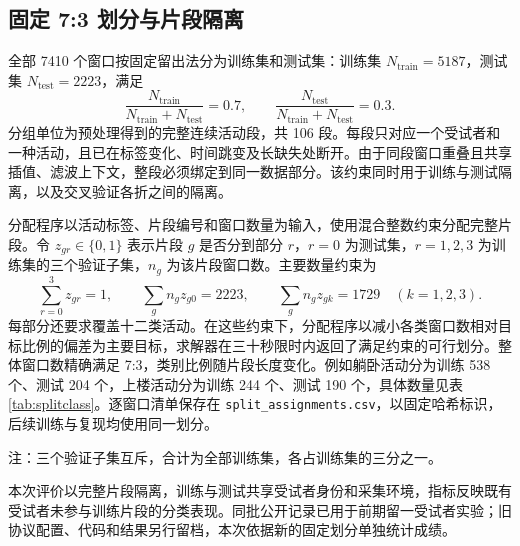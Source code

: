 \documentclass[UTF8,zihao=-4,a4paper,fontset=windows]{ctexart}
\begin{document}
\subsection{固定 7:3 划分与片段隔离}
全部 7410 个窗口按固定留出法分为训练集和测试集：训练集 $N_{\mathrm{train}}=5187$，测试集 $N_{\mathrm{test}}=2223$，满足
\begin{equation}
\frac{N_{\mathrm{train}}}{N_{\mathrm{train}}+N_{\mathrm{test}}}=0.7,\qquad
\frac{N_{\mathrm{test}}}{N_{\mathrm{train}}+N_{\mathrm{test}}}=0.3.
\end{equation}
分组单位为预处理得到的完整连续活动段，共 106 段。每段只对应一个受试者和一种活动，且已在标签变化、时间跳变及长缺失处断开。由于同段窗口重叠且共享插值、滤波上下文，整段必须绑定到同一数据部分。该约束同时用于训练与测试隔离，以及交叉验证各折之间的隔离。

分配程序以活动标签、片段编号和窗口数量为输入，使用混合整数约束分配完整片段\cite{milp}。令 $z_{gr}\in\{0,1\}$ 表示片段 $g$ 是否分到部分 $r$，$r=0$ 为测试集，$r=1,2,3$ 为训练集的三个验证子集，$n_g$ 为该片段窗口数。主要数量约束为
\begin{equation}
\sum_{r=0}^3 z_{gr}=1,\qquad
\sum_gn_gz_{g0}=2223,\qquad
\sum_gn_gz_{gk}=1729\quad(k=1,2,3).
\end{equation}
每部分还要求覆盖十二类活动。在这些约束下，分配程序以减小各类窗口数相对目标比例的偏差为主要目标，求解器在三十秒限时内返回了满足约束的可行划分。整体窗口数精确满足 7:3，类别比例随片段长度变化。例如躺卧活动分为训练 538 个、测试 204 个，上楼活动分为训练 244 个、测试 190 个，具体数量见表\ref{tab:splitclass}。逐窗口清单保存在 \texttt{split\_assignments.csv}，以固定哈希标识，后续训练与复现均使用同一划分。

\begin{table}[!htbp]\centering
\caption{固定数据划分；后三行是训练集内部的三个互斥验证子集}\label{tab:split}

\par\small 注：三个验证子集互斥，合计为全部训练集，各占训练集的三分之一。
\end{table}
\begin{table}[!htbp]\centering
\caption{训练、测试与交叉验证各验证折的类别覆盖}\label{tab:splitclass}

\end{table}

本次评价以完整片段隔离，训练与测试共享受试者身份和采集环境，指标反映既有受试者未参与训练片段的分类表现。同批公开记录已用于前期留一受试者实验；旧协议配置、代码和结果另行留档，本次依据新的固定划分单独统计成绩。
\end{document}
